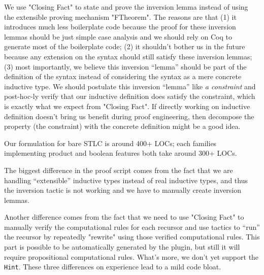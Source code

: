 We use "Closing Fact" to state and prove the inversion lemma instead of
using the extensible proving mechanism "FTheorem". The reasons are that
(1) it introduces much less boilerplate code because the proof for these
inversion lemmas should be just simple case analysis and we should rely
on Coq to generate most of the boilerplate code; (2) it shouldn't bother us in the future
because any extension on the syntax should still satisfy these inversion
lemmas; (3) most importantly, we believe this inversion ``lemma'' should
be part of the definition of the syntax instead of considering the
syntax as a mere concrete inductive type. We should postulate this
inversion ``lemma'' like \textit{a constraint} and post-hoc-ly verify
that our inductive definition does satisfy the constraint, which is
exactly what we expect from "Closing Fact". If directly working on inductive definition doesn't bring us benefit during proof engineering, then decompose the property (the constraint) with the concrete definition might be a good idea.

Our formulation for bare STLC is around 400+ LOCs; each families implementing product and boolean features both take around 300+ LOCs. 

The biggest difference in the proof script comes from the fact that we
are handling ``extensible'' inductive types instead of real inductive
types, and thus the inversion tactic is not working and we have to manually
create inversion lemmas. 

Another difference comes from the fact that we need to use "Closing
Fact" to manually verify the computational rules for each recursor and
use tactics to ``run'' the recursor by repeatedly "rewrite" using those
verified computational rules. This part is possible to be automatically
generated by the plugin, but still it will require propositional 
computational rules.  What's more, we don't yet support the \texttt{Hint}. These three differences on experience lead to a mild code bloat. 

